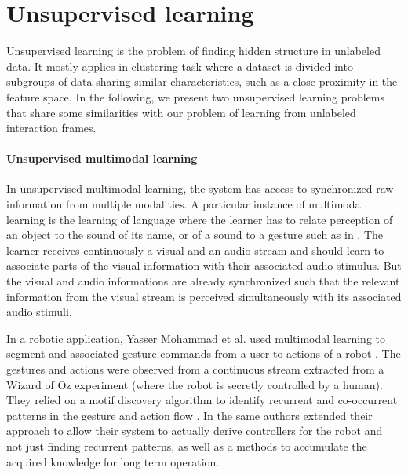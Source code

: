 \section{Unsupervised learning}

Unsupervised learning is the problem of finding hidden structure in unlabeled data. It mostly applies in clustering task where a dataset is divided into subgroups of data sharing similar characteristics, such as a close proximity in the feature space. In the following, we present two unsupervised learning problems that share some similarities with our problem of learning from unlabeled interaction frames.


\paragraph{Unsupervised multimodal learning} In unsupervised multimodal learning, the system has access to synchronized raw information from multiple modalities. A particular instance of multimodal learning is the learning of language where the learner has to relate perception of an object to the sound of its name, or of a sound to a gesture such as in \cite{mangin2013learning}. The learner receives continuously a visual and an audio stream and should learn to associate parts of the visual information with their associated audio stimulus. But the visual and audio informations are already synchronized such that the relevant information from the visual stream is perceived simultaneously with its associated audio stimuli.

In a robotic application, Yasser Mohammad et al. used multimodal learning to segment and associated gesture commands from a user to actions of a robot \cite{mohammad2009unsupervised}. The gestures and actions were observed from a continuous stream extracted from a Wizard of Oz experiment (where the robot is secretly controlled by a human). They relied on a motif discovery algorithm to identify recurrent and co-occurrent patterns in the gesture and action flow \cite{mohammad2009constrained}. In \cite{mohammad2010learning} the same authors extended their approach to allow their system to actually derive controllers for the robot and not just finding recurrent patterns, as well as a methods to accumulate the acquired knowledge for long term operation.

